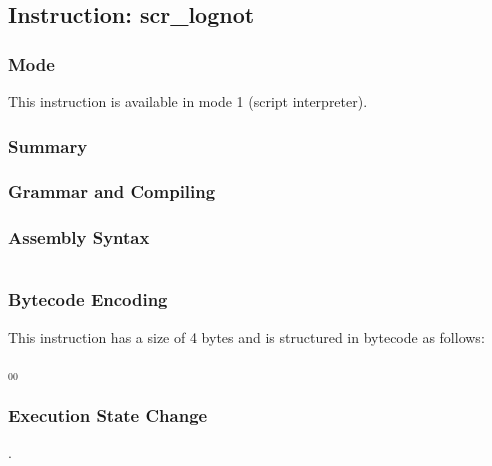 \subsection{Instruction: scr\_lognot}

\subsubsection{Mode}
This instruction is available in mode 1 (script interpreter).
\subsubsection{Summary}


\subsubsection{Grammar and Compiling}


\subsubsection{Assembly Syntax}

\begin{myquote}
\begin{verbatim}

\end{verbatim}
\end{myquote}

\subsubsection{Bytecode Encoding}

This instruction has a size of 4 bytes and is structured in bytecode as follows:

$_{00}$\ 


\subsubsection{Execution State Change}

.


